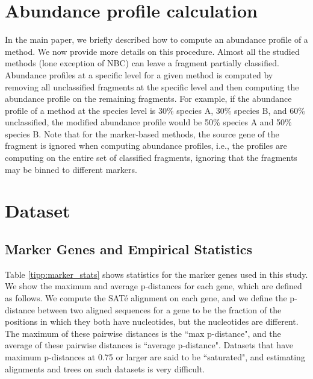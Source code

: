 
\newpage

\section{Abundance profile calculation}\label{supp:profile_estimation}
In the main paper, we briefly described how to compute an abundance profile of a method.  We now provide more details on this procedure.  Almost all the studied methods (lone exception of NBC) can leave a fragment partially classified.  Abundance profiles at a specific level for a given method is computed by removing all unclassified fragments at the specific level and then computing the abundance profile on the remaining fragments.  For example, if the abundance profile of a method at the species level is 30\% species A, 30\% species B, and 60\% unclassified, the modified abundance profile would be 50\% species A and 50\% species B.  Note that for the marker-based methods, the source gene of the fragment is ignored when computing abundance profiles, i.e., the profiles are computing on the entire set of classified fragments, ignoring that the fragments may be binned to different markers.

\section{Dataset}

\subsection{Marker Genes and Empirical Statistics\label{tipp:marker_genes}}
Table \ref{tipp:marker_stats} shows statistics for the marker genes used in this study. 
We show the maximum and average p-distances for each gene, which are defined as
follows.  We compute the SAT\'{e} alignment on each gene, and we define the
p-distance between two aligned sequences for a gene to be the fraction of
the positions in which they both have nucleotides, but the nucleotides are different.
The maximum of these pairwise distances is the ``max p-distance", and the
average of these pairwise distances is ``average p-distance". Datasets
that have maximum p-distances at 0.75 or larger are said to be ``saturated",
and estimating alignments and trees on such datasets is very difficult.

